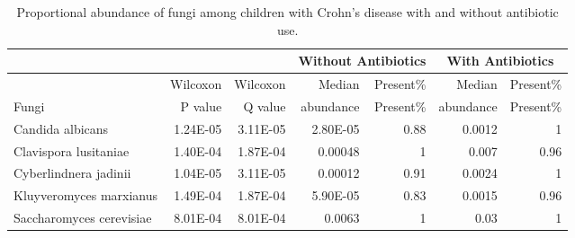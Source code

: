 {\footnotesize
	\renewcommand{\arraystretch}{0.7} \setlength{\tabcolsep}{3pt}
	\begin{longtable}{ | l | r | r | r | r | r | r  | }
		\caption[Proportional abundance of fungi among children with Crohn's disease  with and without antibiotic use]{Proportional abundance of fungi among children with Crohn's disease  with and without antibiotic use.} 
		\label{TS12} \\
		
		\hline
		\multicolumn{3}{|c|}{} & \multicolumn{2}{c}{Without Antibiotics}
		& \multicolumn{2}{|c|}{With Antibiotics}\\
		\hline 
		& Wilcoxon & Wilcoxon & Median  & Present\% & Median  & Present\% \\ 
		Fungi &  P value & Q value &  abundance & Present\% &  abundance & Present\% \\ 
			\hline 
		\endfirsthead
		
		
		\endfoot
		
		\hline 
		\endlastfoot
		
		
		
		Candida albicans & 1.24E-05 & 3.11E-05 & 2.80E-05 & 0.88 & 0.0012 & 1 \\ 
		Clavispora lusitaniae & 1.40E-04 & 1.87E-04 & 0.00048 & 1 & 0.007 & 0.96 \\ 
		Cyberlindnera jadinii & 1.04E-05 & 3.11E-05 & 0.00012 & 0.91 & 0.0024 & 1 \\ 
		Kluyveromyces marxianus & 1.49E-04 & 1.87E-04 & 5.90E-05 & 0.83 & 0.0015 & 0.96 \\ 
		Saccharomyces cerevisiae & 8.01E-04 & 8.01E-04 & 0.0063 & 1 & 0.03 & 1
		
	\end{longtable}
}




